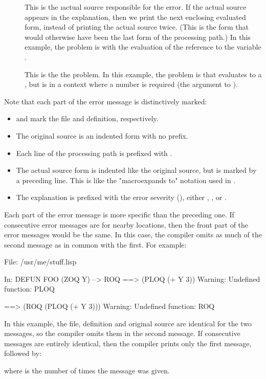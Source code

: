 {\begin{description}
\item[]
This is the \i{actual source} responsible for the error.  If the actual
source appears in the explanation, then we print the next enclosing evaluated
form, instead of printing the actual source twice.  (This is the form that
would otherwise have been the last form of the processing path.)  In this
example, the problem is with the evaluation of the reference to the variable
.

\item[]
This is the  the problem.  In this example, the
problem is that  evaluates to a , but is in a context where a
number is required (the argument to \code{+}).
\end{description}

Note that each part of the error message is distinctively marked:
\begin{itemize}

\item
{} and  mark the file and definition, respectively.

\item
The original source is an indented form with no prefix.

\item
Each line of the processing path is prefixed with \code{-->}.

\item
The actual source form is indented like the original source, but is marked by a
preceding \code{==>} line.  This is like the "macroexpands to" notation used in
\cltl.

\item
The explanation is prefixed with the error severity (), either , , or .
\end{itemize}


Each part of the error message is more specific than the preceding one.  If
consecutive error messages are for nearby locations, then the front part of the
error messages would be the same.  In this case, the compiler omits as much of
the second message as in common with the first.  For example:
\begin{example}
File: /usr/me/stuff.lisp

In: DEFUN FOO
  (ZOQ Y)
--> ROQ 
==>
  (PLOQ (+ Y 3))
Warning: Undefined function: PLOQ

==>
  (ROQ (PLOQ (+ Y 3)))
Warning: Undefined function: ROQ
\end{example}
In this example, the file, definition and original source are identical for the
two messages, so the compiler omits them in the second message.  If consecutive
messages are entirely identical, then the compiler prints only the first
message, followed by:
\begin{example}
\end{example}
where  is the number of times the message was given.

}
